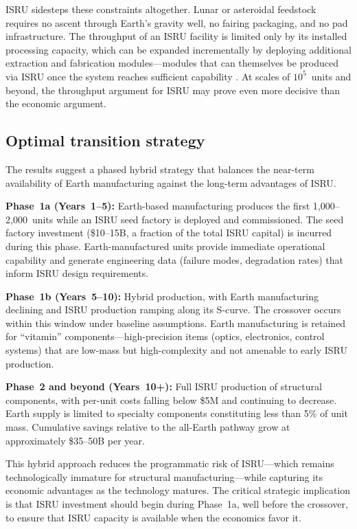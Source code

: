 \documentclass[preprint,12pt]{elsarticle}
\begin{document}
ISRU sidesteps these constraints altogether. Lunar or asteroidal feedstock requires no ascent through Earth's gravity well, no fairing packaging, and no pad infrastructure. The throughput of an ISRU facility is limited only by its installed processing capacity, which can be expanded incrementally by deploying additional extraction and fabrication modules---modules that can themselves be produced via ISRU once the system reaches sufficient capability \cite{metzger2013}. At scales of $10^5$~units and beyond, the throughput argument for ISRU may prove even more decisive than the economic argument.

\subsection{Optimal transition strategy}

The results suggest a phased hybrid strategy that balances the near-term availability of Earth manufacturing against the long-term advantages of ISRU.

\textbf{Phase~1a (Years~1--5):} Earth-based manufacturing produces the first 1{,}000--2{,}000~units while an ISRU seed factory is deployed and commissioned. The seed factory investment (\$10--15B, a fraction of the total ISRU capital) is incurred during this phase. Earth-manufactured units provide immediate operational capability and generate engineering data (failure modes, degradation rates) that inform ISRU design requirements.

\textbf{Phase~1b (Years~5--10):} Hybrid production, with Earth manufacturing declining and ISRU production ramping along its S-curve. The crossover occurs within this window under baseline assumptions. Earth manufacturing is retained for ``vitamin'' components---high-precision items (optics, electronics, control systems) that are low-mass but high-complexity and not amenable to early ISRU production.

\textbf{Phase~2 and beyond (Years~10+):} Full ISRU production of structural components, with per-unit costs falling below \$5M and continuing to decrease. Earth supply is limited to specialty components constituting less than 5\% of unit mass. Cumulative savings relative to the all-Earth pathway grow at approximately \$35--50B per year.

This hybrid approach reduces the programmatic risk of ISRU---which remains technologically immature for structural manufacturing---while capturing its economic advantages as the technology matures. The critical strategic implication is that ISRU investment should begin during Phase~1a, well before the crossover, to ensure that ISRU capacity is available when the economics favor it.
\end{document}
